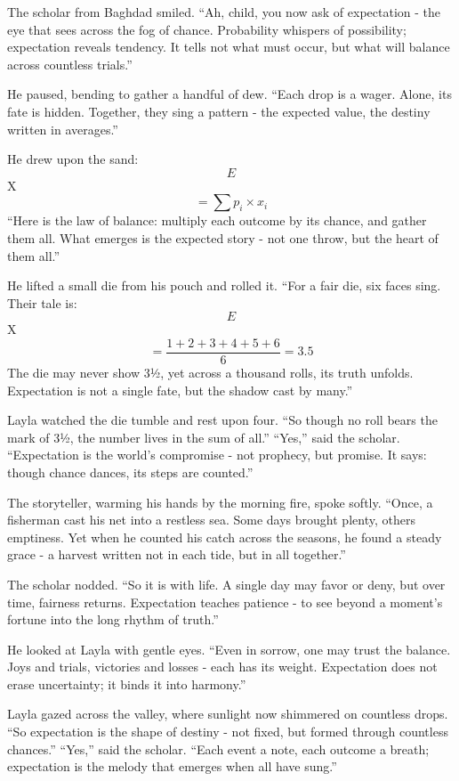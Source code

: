\documentclass[
  letterpaper,
  DIV=11,
  numbers=noendperiod]{scrreprt}
\begin{document}
The scholar from Baghdad smiled. ``Ah, child, you now ask of expectation
- the eye that sees across the fog of chance. Probability whispers of
possibility; expectation reveals tendency. It tells not what must occur,
but what will balance across countless trials.''

He paused, bending to gather a handful of dew. ``Each drop is a wager.
Alone, its fate is hidden. Together, they sing a pattern - the expected
value, the destiny written in averages.''

He drew upon the sand: \[
E\]X\[ = \sum p_i \times x_i
\] ``Here is the law of balance: multiply each outcome by its chance,
and gather them all. What emerges is the expected story - not one throw,
but the heart of them all.''

He lifted a small die from his pouch and rolled it. ``For a fair die,
six faces sing. Their tale is: \[
E\]X\[ = \frac{1 + 2 + 3 + 4 + 5 + 6}{6} = 3.5
\] The die may never show 3½, yet across a thousand rolls, its truth
unfolds. Expectation is not a single fate, but the shadow cast by
many.''

Layla watched the die tumble and rest upon four. ``So though no roll
bears the mark of 3½, the number lives in the sum of all.'' ``Yes,''
said the scholar. ``Expectation is the world's compromise - not
prophecy, but promise. It says: though chance dances, its steps are
counted.''

The storyteller, warming his hands by the morning fire, spoke softly.
``Once, a fisherman cast his net into a restless sea. Some days brought
plenty, others emptiness. Yet when he counted his catch across the
seasons, he found a steady grace - a harvest written not in each tide,
but in all together.''

The scholar nodded. ``So it is with life. A single day may favor or
deny, but over time, fairness returns. Expectation teaches patience - to
see beyond a moment's fortune into the long rhythm of truth.''

He looked at Layla with gentle eyes. ``Even in sorrow, one may trust the
balance. Joys and trials, victories and losses - each has its weight.
Expectation does not erase uncertainty; it binds it into harmony.''

Layla gazed across the valley, where sunlight now shimmered on countless
drops. ``So expectation is the shape of destiny - not fixed, but formed
through countless chances.'' ``Yes,'' said the scholar. ``Each event a
note, each outcome a breath; expectation is the melody that emerges when
all have sung.''
\end{document}
